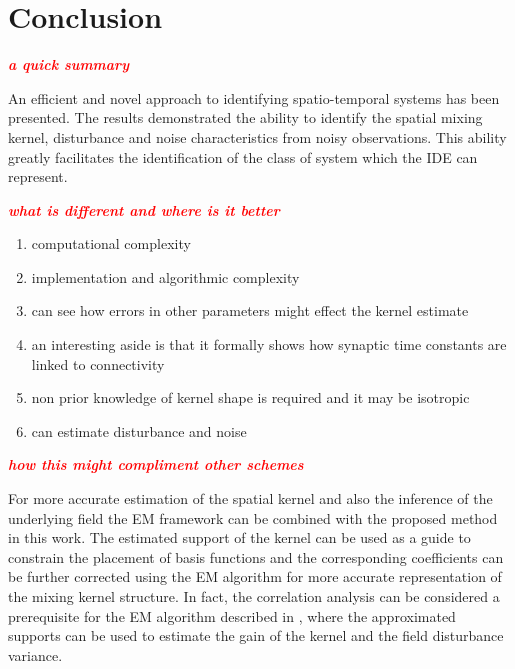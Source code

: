 \documentclass[10pt,twocolumn,twoside]{IEEEtran}
\newcommand{\dean}[1]{\textsf{\emph{\textbf{\textcolor{red}{#1}}}}}
\begin{document}
{%
\section{Conclusion}
\dean{a quick summary}

An efficient and novel approach to identifying spatio-temporal systems has been presented. The results demonstrated the ability to identify the spatial mixing kernel, disturbance and noise characteristics from noisy observations. This ability greatly facilitates the identification of the class of system which the IDE can represent.

\dean{what is different and where is it better}

\begin{enumerate}
	\item computational complexity
	\item implementation and algorithmic complexity
	\item can see how errors in other parameters might effect the kernel estimate
	\item an interesting aside is that it formally shows how synaptic time constants are linked to connectivity
	\item non prior knowledge of kernel shape is required and it may be isotropic
	\item can estimate disturbance and noise
\end{enumerate}


\dean{how this might compliment other schemes}

For more accurate estimation of the spatial kernel and also the inference of the underlying field the EM framework can be combined with the proposed method in this work. The estimated support of the kernel can be  used as a guide to constrain the placement of basis functions and the corresponding coefficients can be further corrected using the EM algorithm for more accurate representation of the mixing kernel structure. In fact, the correlation analysis can be considered a prerequisite for the EM algorithm described in \cite{Dewar2009}, where the approximated supports can be used to estimate the gain of the kernel and the field disturbance variance.                                             
         
}
\end{document}
